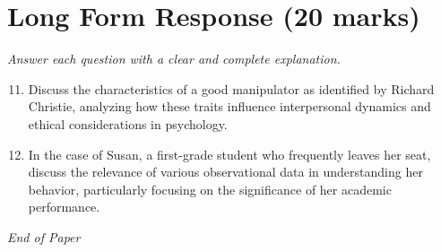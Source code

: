 \documentclass[12pt]{article}
\begin{document}
\section*{Long Form Response (20 marks)}
\textit{Answer each question with a clear and complete explanation.}
\begin{enumerate}[label=\arabic*.]
\setcounter{enumi}{10}
\item Discuss the characteristics of a good manipulator as identified by Richard Christie, analyzing how these traits influence interpersonal dynamics and ethical considerations in psychology.
\item In the case of Susan, a first-grade student who frequently leaves her seat, discuss the relevance of various observational data in understanding her behavior, particularly focusing on the significance of her academic performance.
\end{enumerate}

\vfill
\noindent\textit{End of Paper}
\end{document}
